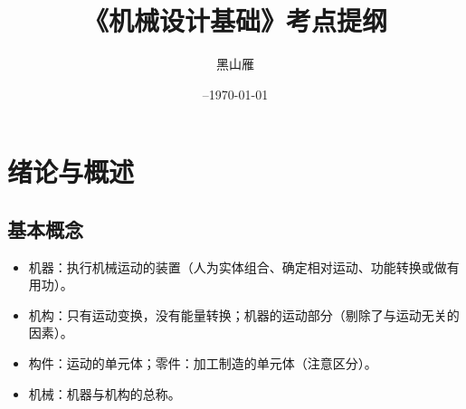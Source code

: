 \documentclass[12pt,a4paper]{article}
\title{《机械设计基础》考点提纲}
\date{\beginday--\today}
\author{黑山雁}
\newcommand{\tightlist}{\setlength{\parskip}{0pt}\setlength{\itemsep}{0pt}}
\newcommand{\hint}[1]{\textsf{（#1）}}
\newcommand{\minor}[1]{{\color{gray} #1}}
\begin{document}
\maketitle

\section{绪论与概述}
\subsection{基本概念}
\begin{itemize}\tightlist
    \item 机器：执行机械运动的装置\hint{人为实体组合、确定相对运动、功能转换或做有用功}。
    \item 机构：只有运动变换，没有能量转换；机器的运动部分\hint{剔除了与运动无关的因素}。
    \item 构件：运动的单元体；零件：加工制造的单元体\hint{注意区分}。
    \item \minor{机械：机器与机构的总称。}
\end{itemize}
\end{document}
